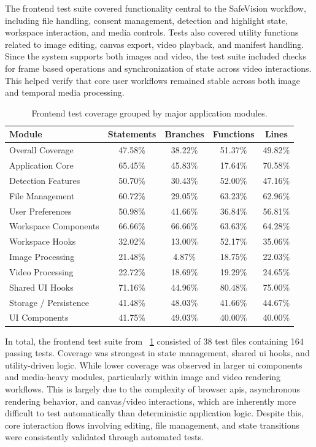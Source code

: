 The frontend test suite covered functionality central to the \gls{SafeVision} workflow, including file handling, consent management, detection and highlight state, workspace interaction, and media controls. Tests also covered utility functions related to image editing, canvas export, video playback, and manifest handling. Since the system supports both images and video, the test suite included checks for frame based operations and synchronization of state across video interactions. This helped verify that core user workflows remained stable across both image and temporal media processing.

\begin{table}[H]
\centering
\small
\begin{tabular}{lcccc}
\hline
\textbf{Module} & \textbf{Statements} & \textbf{Branches} & \textbf{Functions} & \textbf{Lines} \\
\hline
Overall Coverage      & 47.58\% & 38.22\% & 51.37\% & 49.82\% \\
Application Core      & 65.45\% & 45.83\% & 17.64\% & 70.58\% \\
Detection Features    & 50.70\% & 30.43\% & 52.00\% & 47.16\% \\
File Management       & 60.72\% & 29.05\% & 63.23\% & 62.96\% \\
User Preferences      & 50.98\% & 41.66\% & 36.84\% & 56.81\% \\
Workspace Components  & 66.66\% & 66.66\% & 63.63\% & 64.28\% \\
Workspace Hooks       & 32.02\% & 13.00\% & 52.17\% & 35.06\% \\
Image Processing      & 21.48\% & 4.87\%  & 18.75\% & 22.03\% \\
Video Processing      & 22.72\% & 18.69\% & 19.29\% & 24.65\% \\
Shared UI Hooks       & 71.16\% & 44.96\% & 80.48\% & 75.00\% \\
Storage / Persistence & 41.48\% & 48.03\% & 41.66\% & 44.67\% \\
UI Components         & 41.75\% & 49.03\% & 40.00\% & 40.00\% \\
\hline
\end{tabular}
\caption{Frontend test coverage grouped by major application modules. }
\label{tab:frontend_coverage}
\end{table}
 
In total, the frontend test suite from ~\ref{tab:frontend_coverage} consisted of 38 test files containing 164 passing tests. Coverage was strongest in state management, shared \acrshort{ui} hooks, and utility-driven logic. While lower coverage was observed in larger \acrshort{ui} components and media-heavy modules, particularly within image and video rendering workflows. This is largely due to the complexity of browser \acrshort{api}s, asynchronous rendering behavior, and canvas/video interactions, which are inherently more difficult to test automatically than deterministic application logic. Despite this, core interaction flows involving editing, file management, and state transitions were consistently validated through automated tests.

